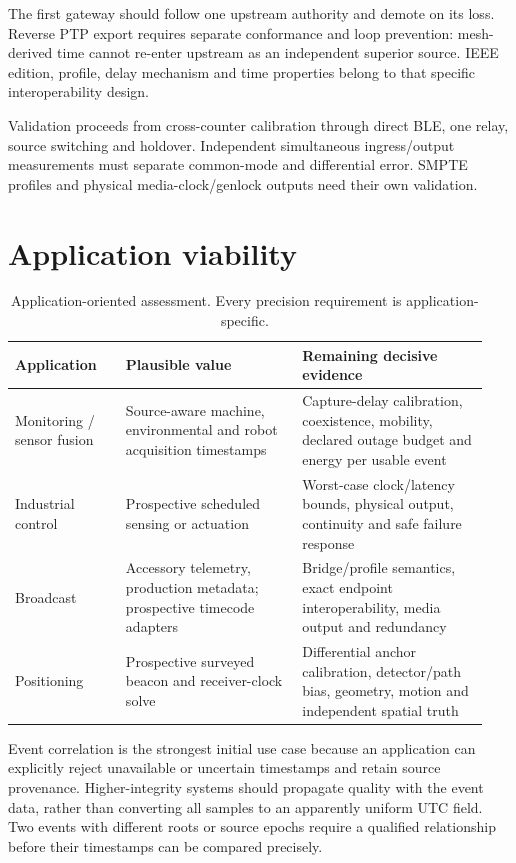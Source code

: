 \documentclass[11pt,letterpaper]{article}
\begin{document}
The first gateway should follow one upstream authority and demote on its loss. Reverse PTP export requires separate conformance and loop prevention: mesh-derived time cannot re-enter upstream as an independent superior source. IEEE edition, profile, delay mechanism and time properties belong to that specific interoperability design.

Validation proceeds from cross-counter calibration through direct BLE, one relay, source switching and holdover. Independent simultaneous ingress/output measurements must separate common-mode and differential error. SMPTE profiles and physical media-clock/genlock outputs need their own validation.

\section{Application viability}
\begin{table}[htbp]\centering\small
\caption{Application-oriented assessment. Every precision requirement is application-specific.}\label{tab:apps}
\begin{tabular}{@{}L{0.22\linewidth}L{0.35\linewidth}L{0.37\linewidth}@{}}\toprule
Application & Plausible value & Remaining decisive evidence\\\midrule
Monitoring / sensor fusion & Source-aware machine, environmental and robot acquisition timestamps & Capture-delay calibration, coexistence, mobility, declared outage budget and energy per usable event\\\addlinespace
Industrial control & Prospective scheduled sensing or actuation & Worst-case clock/latency bounds, physical output, continuity and safe failure response\\\addlinespace
Broadcast & Accessory telemetry, production metadata; prospective timecode adapters & Bridge/profile semantics, exact endpoint interoperability, media output and redundancy\\\addlinespace
Positioning & Prospective surveyed beacon and receiver-clock solve & Differential anchor calibration, detector/path bias, geometry, motion and independent spatial truth\\\bottomrule
\end{tabular}
\end{table}

Event correlation is the strongest initial use case because an application can explicitly reject unavailable or uncertain timestamps and retain source provenance. Higher-integrity systems should propagate quality with the event data, rather than converting all samples to an apparently uniform UTC field. Two events with different roots or source epochs require a qualified relationship before their timestamps can be compared precisely.
\end{document}
